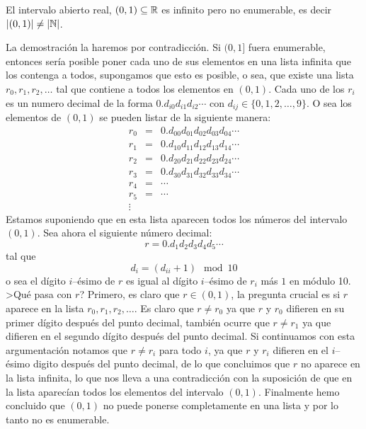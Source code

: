 \begin{teorema}[(Cantor)]
El intervalo abierto real, $(0,1)\subseteq\mathbb{R}$ es infinito pero no enumerable, es decir $|(0,1)|\not=|\mathbb{N}|$.

\begin{demostracion}
La demostración la haremos por contradicción.
Si $(0,1]$ fuera enumerable, entonces sería posible poner cada uno de sus elementos en una lista infinita que los contenga a todos, supongamos que esto es posible, o sea, que existe una lista $r_0,r_1,r_2,\ldots$ tal que contiene a todos los elementos en $(0,1)$.
Cada uno de los $r_i$ es un numero decimal de la forma $0.d_{i0}d_{i1}d_{i2}\cdots$ con $d_{ij}\in\{0,1,2,\ldots,9\}$.
O sea los elementos de $(0,1)$ se pueden listar de la siguiente manera:
\[
\begin{array}{ccl}
r_0 & = & 0.d_{00}d_{01}d_{02}d_{03}d_{04}\cdots \\
r_1 & = & 0.d_{10}d_{11}d_{12}d_{13}d_{14}\cdots \\
r_2 & = & 0.d_{20}d_{21}d_{22}d_{23}d_{24}\cdots \\
r_3 & = & 0.d_{30}d_{31}d_{32}d_{33}d_{34}\cdots \\ 
r_4 & = & \cdots \\
r_5 & = & \cdots \\
\vdots
\end{array}
\] 
Estamos suponiendo que en esta lista aparecen todos los números del intervalo $(0,1)$.
Sea ahora el siguiente número decimal:
\[
r=0.d_1d_2d_3d_4d_5\cdots
\]
tal que 
\[
d_i=(d_{ii}+1)\mod 10
\]
o sea el dígito $i$--ésimo de $r$ es igual al dígito $i$--ésimo de $r_i$ más $1$ en módulo 10.
>Qué pasa con $r$?
Primero, es claro que $r\in (0,1)$, la pregunta crucial es si $r$ aparece en la lista $r_0,r_1,r_2,\ldots$.
Es claro que $r\not=r_0$ ya que $r$ y $r_0$ difieren en su primer dígito después del punto decimal, también ocurre que $r\not=r_1$ ya que difieren en el segundo dígito después del punto decimal.
Si continuamos con esta argumentación notamos que $r\not=r_i$ para todo $i$, ya que $r$ y $r_i$ difieren en el $i$--ésimo digito después del punto decimal, de lo que concluimos que $r$ no aparece en la lista infinita, lo que nos lleva a una contradicción con la suposición de que en la lista aparecían todos los elementos del intervalo $(0,1)$.
Finalmente hemo concluido que $(0,1)$ no puede ponerse completamente en una lista y por lo tanto no es enumerable.
\end{demostracion}
\end{teorema}

